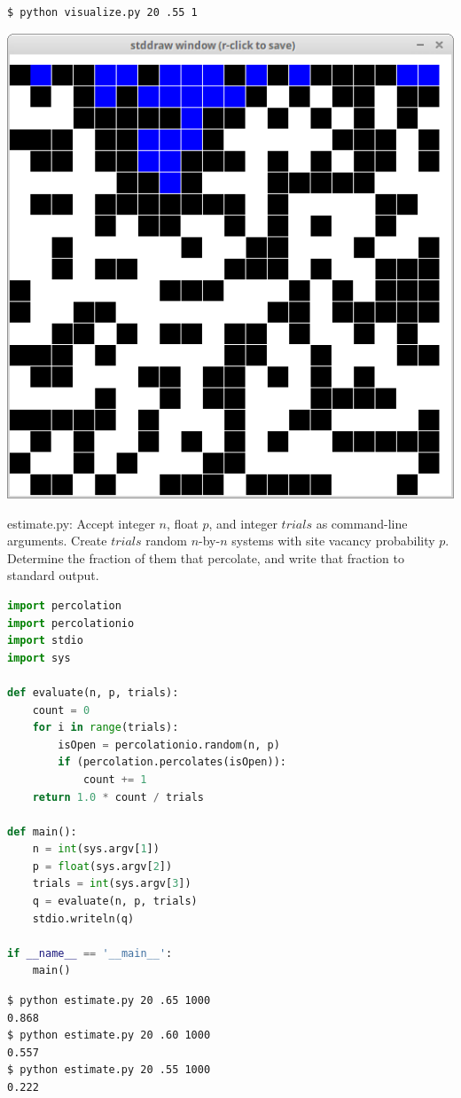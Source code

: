 \documentclass[8pt,a4paper,compress,handout]{beamer}
\begin{document}
\begin{frame}[fragile]
\begin{minipage}{160pt}
\begin{lstlisting}[language={}]
$ python visualize.py 20 .55 1
\end{lstlisting}
\end{minipage}%
\begin{minipage}{140pt}
\hfill \includegraphics[scale=0.15]{figures/percolation12.png}
\end{minipage}
\end{frame}

\begin{frame}[fragile]
\begin{framed}
\tiny estimate.py: Accept integer $n$, float $p$, and integer $trials$ as command-line arguments. Create $trials$ random $n$-by-$n$ systems with site vacancy probability $p$. Determine the fraction of them that percolate, and
write that fraction to standard output.
\end{framed}

\begin{lstlisting}[language=Python]
import percolation
import percolationio
import stdio
import sys

def evaluate(n, p, trials):
    count = 0
    for i in range(trials):
        isOpen = percolationio.random(n, p)
        if (percolation.percolates(isOpen)):
            count += 1
    return 1.0 * count / trials

def main():
    n = int(sys.argv[1])
    p = float(sys.argv[2])
    trials = int(sys.argv[3])
    q = evaluate(n, p, trials)
    stdio.writeln(q)

if __name__ == '__main__':
    main()
\end{lstlisting}

\begin{lstlisting}[language={}]
$ python estimate.py 20 .65 1000
0.868
$ python estimate.py 20 .60 1000
0.557
$ python estimate.py 20 .55 1000
0.222
\end{lstlisting}
\end{frame}
\end{document}
